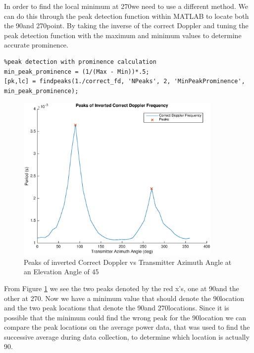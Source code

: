 In order to find the local minimum at 270\textdegree \space we need to use a different method.  We can do this through the peak detection function within MATLAB to locate both the 90\textdegree \space and 270\textdegree \space point. By taking the inverse of the correct Doppler and tuning the peak detection function with the maximum and minimum values to determine accurate prominence.

\begin{lstlisting}
%peak detection with prominence calculation
min_peak_prominence = (1/(Max - Min))*.5;
[pk,lc] = findpeaks(1./correct_fd, 'NPeaks', 2, 'MinPeakProminence', min_peak_prominence);
\end{lstlisting}

\begin{figure}
	\begin{center}
		\includegraphics[width=10cm]{images/results/Correct_doppler_inverse_peaks.eps}
		\caption{Peaks of inverted Correct Doppler vs Transmitter Azimuth Angle at an Elevation Angle of 45\textdegree}
		\label{fig:peaks}
	\end{center}
\end{figure}

From Figure \ref{fig:peaks}  we see the two peaks denoted by the red x's, one at 90\textdegree \space and the other at  270\textdegree. Now we have a minimum value that should denote the 90\textdegree \space location and the two peak locations that denote the 90\textdegree \space and 270\textdegree \space locations. Since it is possible that the minimum could find the wrong peak for the 90\textdegree \space location we can compare the peak locations on the average power data, that was used to find the successive average during data collection, to determine which location is actually 90\textdegree.

